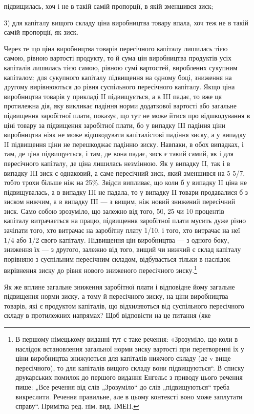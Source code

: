 \parcont{}  %
підвищилась, хоч і не в такій самій пропорції, в якій зменшився
зиск;

3) для капіталу вищого складу ціна виробництва товару впала,
хоч теж не в такій самій пропорції, як зиск.

Через те що ціна виробництва товарів пересічного капіталу
лишилась тією самою, рівною вартості продукту, то й сума цін
виробництва продуктів усіх капіталів лишилась тією самою,
рівною сумі вартостей, вироблених сукупним капіталом; для
сукупного капіталу підвищення на одному боці, зниження на
другому вирівнюються до рівня суспільного пересічного капіталу.
Якщо ціна виробництва товарів у прикладі II підвищується,
а в III падає, то вже ця протилежна дія, яку викликає падіння
норми додаткової вартості або загальне підвищення заробітної
плати, показує, що тут не може йтися про відшкодування в
ціні товару за підвищення заробітної плати, бо у випадку III падіння
ціни виробництва ніяк не може відшкодувати капіталістові
падіння зиску, а у випадку II підвищення ціни не перешкоджає
падінню зиску. Навпаки, в обох випадках, і там, де ціна підвищується,
і там, де вона падає, зиск є такий самий, як і для
пересічного капіталу, де ціна лишилась незмінною. Як у випадку
II, так і в випадку III зиск є однаковий, а саме пересічний
зиск, який зменшився на 5 5/7, тобто трохи більше ніж на 25\%.
Звідси випливає, що коли б у випадку II ціна не підвищувалась,
а в випадку III не падала, то у випадку II товари продавалися б
з зиском нижчим, а в випадку III — з вищим, ніж новий знижений
пересічний зиск. Само собою зрозуміло, що залежно від
того, 50, 25 чи 10 процентів капіталу витрачається на працю,
підвищення заробітної плати мусить дуже різно зачіпати
того, хто витрачає на заробітну плату 1/10, і того, хто витрачає
на неї 1/4 або 1/2 свого капіталу. Підвищення цін виробництва
— з одного боку, зниження їх — з другого, залежно від
того, вищий чи нижчий є склад капіталу порівняно з суспільним
пересічним складом, відбувається тільки в наслідок вирівнення
зиску до рівня нового зниженого пересічного зиску.\footnote*{
В першому німецькому виданні тут є таке речення: «Зрозуміло, що коли
в наслідок встановлення загальної норми зиску вартості при перетворенні їх
у ціни виробництва знижуються для капіталів нижчого складу (де v вище пересічного),
то для капіталів вищого складу вони підвищуються“. В списку друкарських
помилок до першого видання Енгельс з приводу цього речення
пише: „Все речення від слів „Зрозуміло“ до слів „підвищуються“ треба викреслити.
Речення правильне, але в цьому контексті воно може заплутати
справу“. Примітка ред. нім. вид. ІМЕН.
}

Як же вплине загальне зниження заробітної плати і відповідне
йому загальне підвищення норми зиску, а тому й пересічного
зиску, на ціни виробництва товарів, які є продуктом
капіталів, що відхиляються від суспільного пересічного складу
в протилежних напрямах? Щоб відповісти на це питання (яке
\parbreak{}  %

